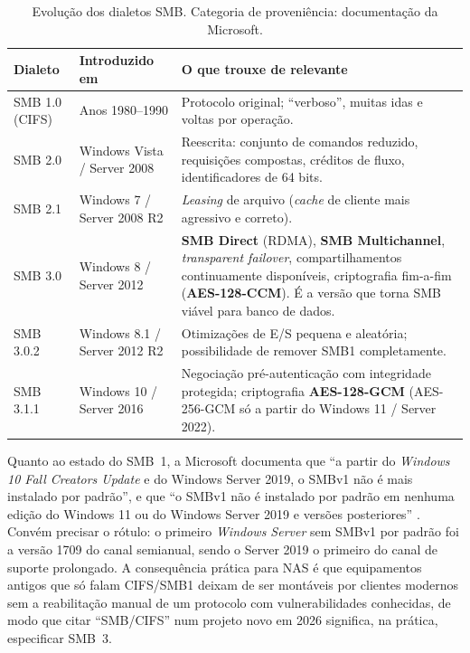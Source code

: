 \documentclass[11pt,a4paper]{article}
\begin{document}
\begin{table}[H]
\centering
\caption{Evolução dos dialetos SMB. Categoria de proveniência: documentação da Microsoft.}
\label{tab:smb}
{\footnotesize
\begin{tabular}{@{}llp{7.9cm}@{}}
\toprule
\textbf{Dialeto} & \textbf{Introduzido em} & \textbf{O que trouxe de relevante} \\
\midrule
SMB 1.0 (CIFS) & Anos 1980--1990 & Protocolo original; ``verboso'', muitas idas e voltas por
operação. \\
SMB 2.0 & Windows Vista / Server 2008 & Reescrita: conjunto de comandos reduzido, requisições
compostas, créditos de fluxo, identificadores de 64 bits. \\
SMB 2.1 & Windows 7 / Server 2008 R2 & \textit{Leasing} de arquivo (\textit{cache} de cliente mais
agressivo e correto). \\
SMB 3.0 & Windows 8 / Server 2012 & \textbf{SMB Direct} (RDMA), \textbf{SMB Multichannel},
\textit{transparent failover}, compartilhamentos continuamente disponíveis, criptografia
fim-a-fim (\textbf{AES-128-CCM}). É a versão que torna SMB viável para banco de dados. \\
SMB 3.0.2 & Windows 8.1 / Server 2012 R2 & Otimizações de E/S pequena e aleatória; possibilidade
de remover SMB1 completamente. \\
SMB 3.1.1 & Windows 10 / Server 2016 & Negociação pré-autenticação com integridade protegida;
criptografia \textbf{AES-128-GCM} (AES-256-GCM só a partir do Windows 11 / Server 2022). \\
\bottomrule
\end{tabular}}
\end{table}

Quanto ao estado do SMB~1, a Microsoft documenta que ``a partir do \textit{Windows 10 Fall Creators
Update} e do Windows Server 2019, o SMBv1 não é mais instalado por padrão'', e que ``o SMBv1 não é
instalado por padrão em nenhuma edição do Windows 11 ou do Windows Server 2019 e versões
posteriores'' \cite{mssmb1}. Convém precisar o rótulo: o primeiro \textit{Windows Server} sem SMBv1
por padrão foi a versão 1709 do canal semianual, sendo o Server 2019 o primeiro do canal de suporte
prolongado. A consequência prática para NAS é que equipamentos antigos que só falam CIFS/SMB1 deixam
de ser montáveis por clientes modernos sem a reabilitação manual de um protocolo com
vulnerabilidades conhecidas, de modo que citar ``SMB/CIFS'' num projeto novo em 2026 significa, na
prática, especificar SMB~3.
\end{document}
